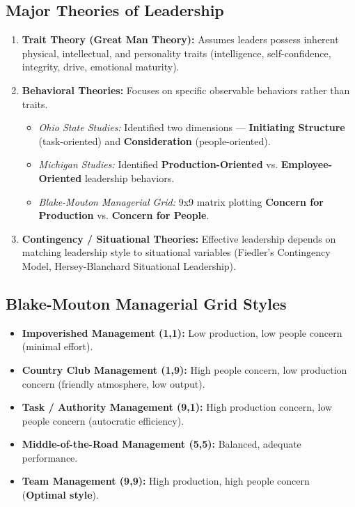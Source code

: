 \documentclass[12pt,a4paper]{article}
\begin{document}
\subsection{Major Theories of Leadership}
\begin{enumerate}[leftmargin=*, itemsep=5pt]
  \item \textbf{Trait Theory (Great Man Theory):} Assumes leaders possess inherent physical, intellectual, and personality traits (intelligence, self-confidence, integrity, drive, emotional maturity).
  \item \textbf{Behavioral Theories:} Focuses on specific observable behaviors rather than traits.
    \begin{itemize}[leftmargin=*, noitemsep]
      \item \textit{Ohio State Studies:} Identified two dimensions --- \textbf{Initiating Structure} (task-oriented) and \textbf{Consideration} (people-oriented).
      \item \textit{Michigan Studies:} Identified \textbf{Production-Oriented} vs. \textbf{Employee-Oriented} leadership behaviors.
      \item \textit{Blake-Mouton Managerial Grid:} 9x9 matrix plotting \textbf{Concern for Production} vs. \textbf{Concern for People}.
    \end{itemize}
  \item \textbf{Contingency / Situational Theories:} Effective leadership depends on matching leadership style to situational variables (Fiedler's Contingency Model, Hersey-Blanchard Situational Leadership).
\end{enumerate}

\subsection{Blake-Mouton Managerial Grid Styles}
\begin{itemize}[leftmargin=*, itemsep=3pt]
  \item \textbf{Impoverished Management (1,1):} Low production, low people concern (minimal effort).
  \item \textbf{Country Club Management (1,9):} High people concern, low production concern (friendly atmosphere, low output).
  \item \textbf{Task / Authority Management (9,1):} High production concern, low people concern (autocratic efficiency).
  \item \textbf{Middle-of-the-Road Management (5,5):} Balanced, adequate performance.
  \item \textbf{Team Management (9,9):} High production, high people concern (\textbf{Optimal style}).
\end{itemize}
\end{document}
